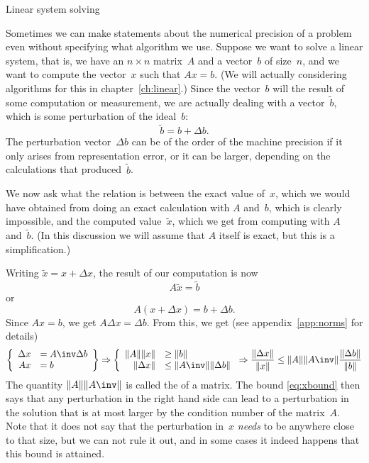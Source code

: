  {Linear system solving}

Sometimes we can make statements about the numerical precision of a
problem even without specifying what algorithm we use. Suppose we want
to solve a linear system, that is, we have an $n\times n$ matrix~$A$
and a vector~$b$ of size~$n$, and we want to compute the vector~$x$
such that $Ax=b$. (We will actually considering algorithms for this in
chapter~\ref{ch:linear}.) Since the vector~$b$ will the result of some
computation or measurement, we are actually dealing with a
vector~$\tilde b$, which is some perturbation of the ideal~$b$:
\[ \tilde b =  b+\Delta b. \]
The perturbation vector~$\Delta b$ can be of the order of the machine
precision if it only arises from representation error, or it can be
larger, depending on the calculations that produced~$\tilde b$.

We now ask what the relation is between the exact value of~$x$, which
we would have obtained from doing an exact calculation with $A$
and~$b$, which is clearly impossible, and
the computed value~$\tilde x$, which we get from computing with $A$
and~$\tilde b$. (In this discussion we will assume that $A$ itself is
exact, but this is a simplification.)

Writing $\tilde x= x+\Delta x$, the result of our computation is now
\[ A\tilde x = \tilde b \] or \[ A(x+\Delta x)=b+\Delta b. \]
Since $Ax=b$, we get $A\Delta x=\Delta b$. From this, we get
(see appendix~\ref{app:norms} for details)
\begin{equation}
 \left \{
\begin{array}{rl}
  \Delta x&=A\inv \Delta b\\ Ax&=b
\end{array} \right\} \Rightarrow \left\{
\begin{array}{rl}
  \|A\| \|x\|&\geq\|b\| \\ \|\Delta x\|&\leq \|A\inv\| \|\Delta b\|
\end{array} \right.
\Rightarrow
\frac{\|\Delta x\|}{\|x\|}
\leq 
\|A\| \|A\inv\| \frac{\|\Delta b\|}{\|b\|}
    \label{eq:xbound}
\end{equation}
The quantity $\|A\| \|A\inv\|$ is called the  of a matrix. The bound \eqref{eq:xbound} then says that any
perturbation in the right hand side can lead to a perturbation in the
solution that is at most larger by the condition number of the
matrix~$A$. Note that it does not say that the perturbation in~$x$
\emph{needs} to be anywhere close to that size, but we can not rule it
out, and in some cases it indeed happens that this bound is attained.

